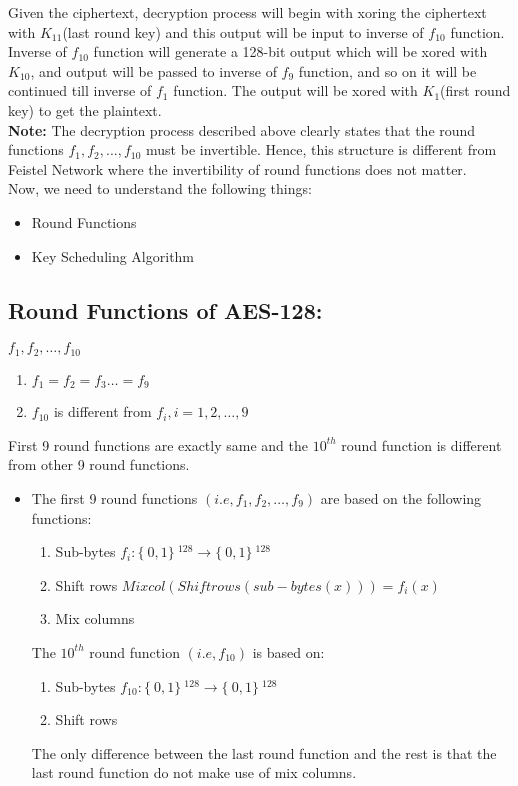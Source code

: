 \documentclass[11pt]{article}
\begin{document}
\vspace{3mm}
Given the ciphertext, decryption process will begin with xoring the ciphertext with $K_{11}$(last round key) and this output will be input to inverse of $f_{10}$ function. Inverse of $f_{10}$ function will generate a 128-bit output which will be xored with $K_{10}$, and output will be passed to inverse of $f_9$ function, and so on it will be continued till inverse of $f_1$ function. The output will be xored with $K_1$(first round key) to get the plaintext.\\
\newline
\textbf{Note:} The decryption process described above clearly states that the round functions $f_1, f_2,..., f_{10}$ must be invertible. Hence, this structure is different from Feistel Network where the invertibility of round functions does not matter. \\
Now, we need to understand the following things:
\begin{itemize}
    \item Round Functions
    \item Key Scheduling Algorithm
\end{itemize}


        \subsection*{Round Functions of AES-128:}  
        $f_1, f_2,\dots, f_{10}$ 
        \begin{enumerate}
            \item $f_1 = f_2 = f_3 \dots = f_9$ 
            \item $f_{10}$ is different from $f_i, i = 1,2,\dots, 9$ \\
        \end{enumerate}
         First 9 round functions are exactly same and the $10^{th}$ round function is different from other 9 round functions.
         \begin{itemize}
         \item The first 9 round functions $(i.e, f_1, f_2, \dots, f_9)$ are based on the following functions:
         \begin{enumerate}
             \item Sub-bytes \hfill $f_i: \{\ 0,1 \}\ ^{128} \to \{\ 0,1 \}\ ^{128} $
             \item Shift rows \hfill $Mix col(Shift rows(sub-bytes(x))) = f_i(x)$
             \item Mix columns
         \end{enumerate}
         The $10^{th}$ round function $(i.e, f_{10})$ is based on: 
         \begin{enumerate}
             \item Sub-bytes \hfill $f_{10}: \{\ 0,1 \}\ ^{128} \to \{\ 0,1 \}\ ^{128} $
             \item Shift rows
         \end{enumerate}
         The only difference between the last round function and the rest is that the last round function do not make use of mix columns.
          \end{itemize}
\end{document}
